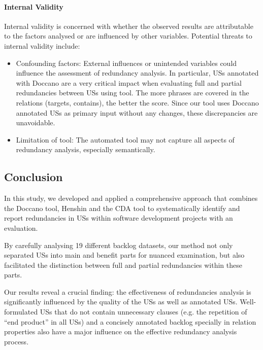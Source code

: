 \paragraph{Internal Validity}Internal validity is concerned with whether the observed results are attributable to the factors analysed or are influenced by other variables. Potential threats to internal validity include:
\begin{itemize}
	\item Confounding factors: External influences or unintended variables could influence the assessment of redundancy analysis. In particular, USs annotated with Doccano are a very critical impact when evaluating full and partial redundancies between USs using tool. The more phrases are covered in the relations (targets, contains), the better the score. Since our tool uses Doccano annotated USs as primary input without any changes, these discrepancies are unavoidable. %
	
	\item Limitation of tool: The automated tool may not capture all aspects of redundancy analysis, especially semantically.
\end{itemize}
\subsection{Conclusion}\label{redundancy_conclustion}
In this study, we developed and applied a comprehensive approach that combines the Doccano tool, Henshin and the CDA tool to systematically identify and report redundancies in USs within software development projects with an evaluation.

By carefully analysing 19 different backlog datasets, our method not only separated USs into main and benefit parts for nuanced examination, but also facilitated the distinction between full and partial redundancies within these parts.

Our results reveal a crucial finding: the effectiveness of redundancies analysis is significantly influenced by the quality of the USs as well as annotated USs. Well-formulated USs that do not contain unnecessary clauses (e.g. the repetition of \enquote{end product} in all USs) and a concisely annotated backlog specially in relation properties also have a major influence on the effective redundancy analysis process.

